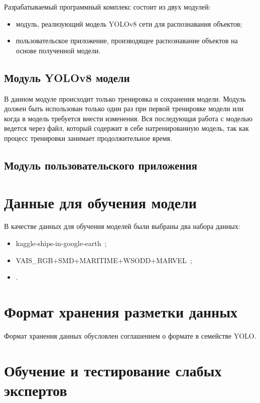 Разрабатываемый программный комплекс состоит из двух модулей:
\begin{itemize}[label=---]
    \item модуль, реализующий модель YOLOv8 сети для распознавания объектов;
    \item пользовательское приложение, производящее распознавание объектов на основе полученной модели.
\end{itemize}

\subsection{Модуль YOLOv8 модели}

В данном модуле происходит только тренировка и сохранения модели. Модуль должен быть использован только один раз при первой тренировке модели или когда в модель требуется внести изменения. Вся последующая работа с моделью ведется через файл, который содержит в себе натренированную модель, так как процесс тренировки занимает продолжительное время.

\subsection{Модуль пользовательского приложения}

\section{Данные для обучения модели}

В качестве данных для обучения моделей были выбраны два набора данных:
\begin{itemize}[label=---]
    \item kaggle-ships-in-google-earth~\cite{kaggle-ships-in-google-earth-dfqwt_dataset};
    \item VAIS\_RGB+SMD+MARITIME+WSODD+MARVEL~\cite{vais_rgb-smd-maritime-wsodd-marvel_dataset};
    \item \cite{ship-ubxk4_dataset}.
\end{itemize}

\section{Формат хранения разметки данных}

Формат хранения данных обусловлен соглашением о формате в семействе YOLO.

\section{Обучение и тестирование слабых экспертов}

